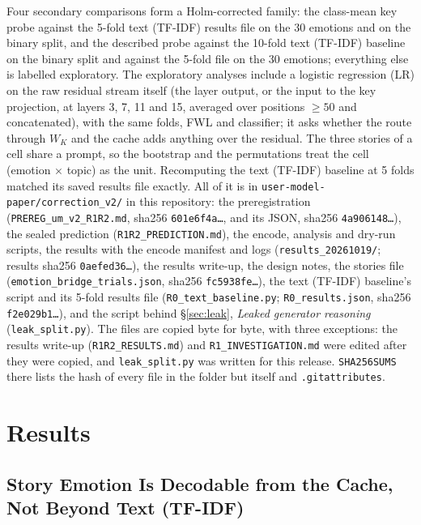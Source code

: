 \documentclass[11pt,a4paper]{article}
\begin{document}
Four secondary comparisons form a Holm-corrected family: the class-mean key probe against the 5-fold text (TF-IDF) results file on the 30 emotions and on the binary split, and the described probe against the 10-fold text (TF-IDF) baseline on the binary split and against the 5-fold file on the 30 emotions; everything else is labelled exploratory. The exploratory analyses include a logistic regression (LR) on the raw residual stream itself (the layer output, or the input to the key projection, at layers 3, 7, 11 and 15, averaged over positions $\geq 50$ and concatenated), with the same folds, FWL and classifier; it asks whether the route through $W_K$ and the cache adds anything over the residual. The three stories of a cell share a prompt, so the bootstrap and the permutations treat the cell (emotion $\times$ topic) as the unit. Recomputing the text (TF-IDF) baseline at 5 folds matched its saved results file exactly. All of it is in \texttt{user-model-paper/correction\_v2/} in this repository: the preregistration (\texttt{PREREG\_um\_v2\_R1R2.md}, sha256 \texttt{601e6f4a\ldots}, and its JSON, sha256 \texttt{4a906148\ldots}), the sealed prediction (\texttt{R1R2\_PREDICTION.md}), the encode, analysis and dry-run scripts, the results with the encode manifest and logs (\texttt{results\_20261019/}; results sha256 \texttt{0aefed36\ldots}), the results write-up, the design notes, the stories file (\texttt{emotion\_bridge\_trials.json}, sha256 \texttt{fc5938fe\ldots}), the text (TF-IDF) baseline's script and its 5-fold results file (\texttt{R0\_text\_baseline.py}; \texttt{R0\_results.json}, sha256 \texttt{f2e029b1\ldots}), and the script behind \S\ref{sec:leak}, \emph{Leaked generator reasoning} (\texttt{leak\_split.py}). The files are copied byte for byte, with three exceptions: the results write-up (\texttt{R1R2\_RESULTS.md}) and \texttt{R1\_INVESTIGATION.md} were edited after they were copied, and \texttt{leak\_split.py} was written for this release. \texttt{SHA256SUMS} there lists the hash of every file in the folder but itself and \texttt{.gitattributes}.

\section{Results}

\subsection{Story Emotion Is Decodable from the Cache, Not Beyond Text (TF-IDF)}
\label{sec:wk_results}
\end{document}
